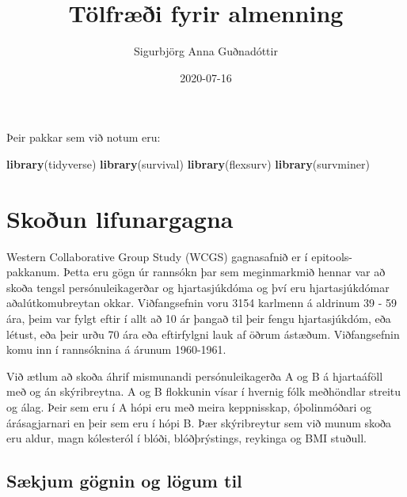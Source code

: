 \documentclass[
]{book}
\title{Tölfræði fyrir almenning}
\author{Sigurbjörg Anna Guðnadóttir}
\date{2020-07-16}
\newenvironment{Shaded}{\begin{snugshade}}{\end{snugshade}}
\newcommand{\KeywordTok}[1]{\textcolor[rgb]{0.13,0.29,0.53}{\textbf{#1}}}
\newcommand{\NormalTok}[1]{#1}
\begin{document}
\maketitle

{
\setcounter{tocdepth}{1}
\tableofcontents
}
Þeir pakkar sem við notum eru:

\begin{Shaded}
\begin{Highlighting}[]
\KeywordTok{library}\NormalTok{(tidyverse)}
\KeywordTok{library}\NormalTok{(survival)}
\KeywordTok{library}\NormalTok{(flexsurv)}
\KeywordTok{library}\NormalTok{(survminer)}
\end{Highlighting}
\end{Shaded}

\hypertarget{lif_skod}{%
\chapter{Skoðun lifunargagna}\label{lif_skod}}

Western Collaborative Group Study (WCGS) gagnasafnið er í epitools- pakkanum. Þetta eru gögn úr rannsókn þar sem meginmarkmið hennar var að skoða tengsl persónuleikagerðar og hjartasjúkdóma og því eru hjartasjúkdómar aðalútkomubreytan okkar. Viðfangsefnin voru 3154 karlmenn á aldrinum 39 - 59 ára, þeim var fylgt eftir í allt að 10 ár þangað til þeir fengu hjartasjúkdóm, eða létust, eða þeir urðu 70 ára eða eftirfylgni lauk af öðrum ástæðum. Viðfangsefnin komu inn í rannsóknina á árunum 1960-1961.

Við ætlum að skoða áhrif mismunandi persónuleikagerða A og B á hjartaáföll með og án skýribreytna. A og B flokkunin vísar í hvernig fólk meðhöndlar streitu og álag. Þeir sem eru í A hópi eru með meira keppnisskap, óþolinmóðari og árásagjarnari en þeir sem eru í hópi B. Þær skýribreytur sem við munum skoða eru aldur, magn kólesteról í blóði, blóðþrýstings, reykinga og BMI stuðull.

\hypertarget{suxe6kjum-guxf6gnin-og-luxf6gum-til}{%
\section{Sækjum gögnin og lögum til}\label{suxe6kjum-guxf6gnin-og-luxf6gum-til}}
\end{document}
